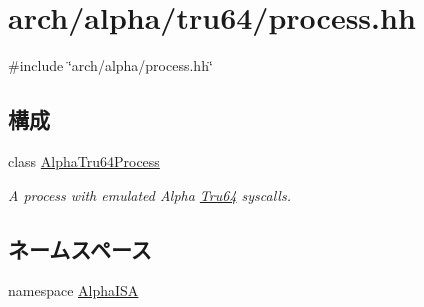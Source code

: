 \hypertarget{arch_2alpha_2tru64_2process_8hh}{
\section{arch/alpha/tru64/process.hh}
\label{arch_2alpha_2tru64_2process_8hh}
}
{\ttfamily \#include \char`\"{}arch/alpha/process.hh\char`\"{}}\par
\subsection*{構成}
\begin{DoxyCompactItemize}
\item 
class \hyperlink{classAlphaISA_1_1AlphaTru64Process}{AlphaTru64Process}
\begin{DoxyCompactList}\small\item\em A process with emulated Alpha \hyperlink{classTru64}{Tru64} syscalls. \item\end{DoxyCompactList}\end{DoxyCompactItemize}
\subsection*{ネームスペース}
\begin{DoxyCompactItemize}
\item 
namespace \hyperlink{namespaceAlphaISA}{AlphaISA}
\end{DoxyCompactItemize}
